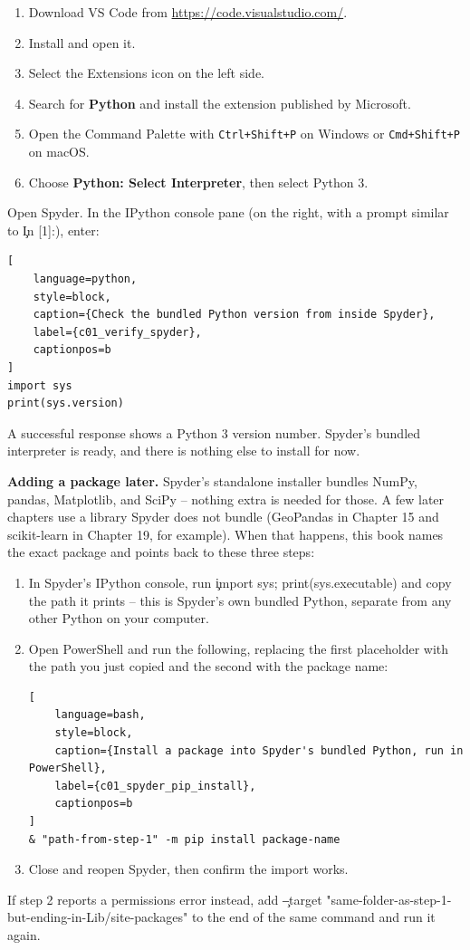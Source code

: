 \begin{enumerate}
    \item Download VS Code from \url{https://code.visualstudio.com/}.
    \item Install and open it.
    \item Select the Extensions icon on the left side.
    \item Search for \textbf{Python} and install the extension published by Microsoft.
    \item Open the Command Palette with \texttt{Ctrl+Shift+P} on Windows or
          \texttt{Cmd+Shift+P} on macOS.
    \item Choose \textbf{Python: Select Interpreter}, then select Python 3.
\end{enumerate}



Open Spyder. In the IPython console pane (on the right, with a prompt similar
to \c{In [1]:}), enter:

\begin{lstlisting}[
    language=python,
    style=block,
    caption={Check the bundled Python version from inside Spyder},
    label={c01_verify_spyder},
    captionpos=b
]
import sys
print(sys.version)
\end{lstlisting}

A successful response shows a Python 3 version number. Spyder's bundled
interpreter is ready, and there is nothing else to install for now.

\begin{NoteBox}
\label{note:spyder-add-package}
\textbf{Adding a package later.} Spyder's standalone installer bundles NumPy,
pandas, Matplotlib, and SciPy -- nothing extra is needed for those. A few
later chapters use a library Spyder does not bundle (GeoPandas in
Chapter 15 and scikit-learn in Chapter 19, for example). When that happens,
this book names the exact package and points back to these three steps:
\begin{enumerate}
    \item In Spyder's IPython console, run \c{import sys; print(sys.executable)}
          and copy the path it prints -- this is Spyder's own bundled Python,
          separate from any other Python on your computer.
    \item Open PowerShell and run the following, replacing the first
          placeholder with the path you just copied and the second with the
          package name:
\begin{lstlisting}[
    language=bash,
    style=block,
    caption={Install a package into Spyder's bundled Python, run in PowerShell},
    label={c01_spyder_pip_install},
    captionpos=b
]
& "path-from-step-1" -m pip install package-name
\end{lstlisting}
    \item Close and reopen Spyder, then confirm the import works.
\end{enumerate}
If step 2 reports a permissions error instead, add
\c{--target "same-folder-as-step-1-but-ending-in-Lib/site-packages"} to the
end of the same command and run it again.
\end{NoteBox}

